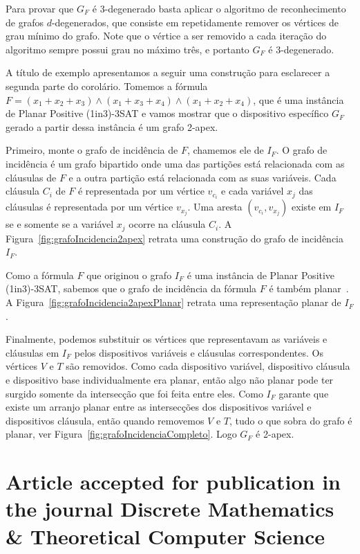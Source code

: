 Para provar que $G_F$ é 3-degenerado basta aplicar o algoritmo de reconhecimento de grafos $d$-degenerados, que consiste em repetidamente remover os vértices de grau mínimo do grafo. Note que o vértice a ser removido a cada iteração do algoritmo sempre possui grau no máximo três, e portanto $G_F$ é 3-degenerado.

A título de exemplo apresentamos a seguir uma construção para esclarecer a segunda parte do corolário. Tomemos a fórmula $F=(x_1+x_2+x_3)\wedge(x_1+x_3+x_4)\wedge(x_1+x_2+x_4)$, que  é uma instância de {\sc Planar Positive (1in3)-3SAT} e vamos mostrar que o dispositivo específico $G_F$ gerado a partir dessa instância é um grafo 2-apex.

Primeiro, monte o grafo de incidência de $F$, chamemos ele de $I_F$. O grafo de incidência é um grafo bipartido onde uma das partições está relacionada com as cláusulas de $F$ e a outra partição está relacionada com as suas variáveis. Cada cláusula $C_i$ de $F$ é representada por um vértice $v_{c_i}$ e cada variável $x_j$ das cláusulas é representada por um vértice $v_{x_j}$. Uma aresta  $(v_{c_i}, v_{x_j})$ existe em $I_F$ se e somente se a variável $x_j$ ocorre na cláusula $C_i$. A Figura~\ref{fig:grafoIncidencia2apex} retrata uma construção do grafo de incidência $I_F$.



Como a fórmula $F$ que originou o grafo $I_F$ é uma instância de {\sc Planar Positive (1in3)-3SAT}, sabemos que o grafo de incidência da fórmula  $F$ é também planar~\cite{mulzer2008minimum}. A Figura~\ref{fig:grafoIncidencia2apexPlanar} retrata uma representação planar de $I_F$.




Finalmente, podemos substituir os vértices que representavam as variáveis e cláusulas em $I_F$ pelos dispositivos variáveis e cláusulas correspondentes. Os vértices $V$ e $T$ são removidos. Como cada dispositivo variável, dispositivo cláusula e dispositivo base individualmente era planar, então algo não planar pode ter surgido somente da intersecção que foi feita entre eles. Como $I_F$ garante que existe um arranjo planar entre as intersecções dos dispositivos variável e dispositivos cláusula, então quando removemos $V$ e $T$, tudo o que sobra do grafo é planar, ver Figura~\ref{fig:grafoIncidenciaCompleto}. Logo $G_F$ é 2-apex.








\section{Article accepted for publication in the journal  Discrete Mathematics \& Theoretical Computer Science} 
